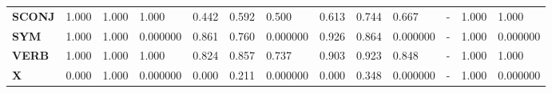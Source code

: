 \begin{table}
\begin{tabular}{|l||l||l||l||l||l||l||l||l||l||l||l||l|}
\textbf{SCONJ} & 1.000 & 1.000 & 1.000 & 0.442 & 0.592 & 0.500 & 0.613 & 0.744 & 0.667 & - & 1.000 & 1.000 \\
\textbf{SYM} & 1.000 & 1.000 & 0.000000 & 0.861 & 0.760 & 0.000000 & 0.926 & 0.864 & 0.000000 & - & 1.000 & 0.000000 \\
\textbf{VERB} & 1.000 & 1.000 & 1.000 & 0.824 & 0.857 & 0.737 & 0.903 & 0.923 & 0.848 & - & 1.000 & 1.000 \\
\textbf{X} & 0.000 & 1.000 & 0.000000 & 0.000 & 0.211 & 0.000000 & 0.000 & 0.348 & 0.000000 & - & 1.000 & 0.000000 \\
\bottomrule
\end{tabular}
\end{table}
